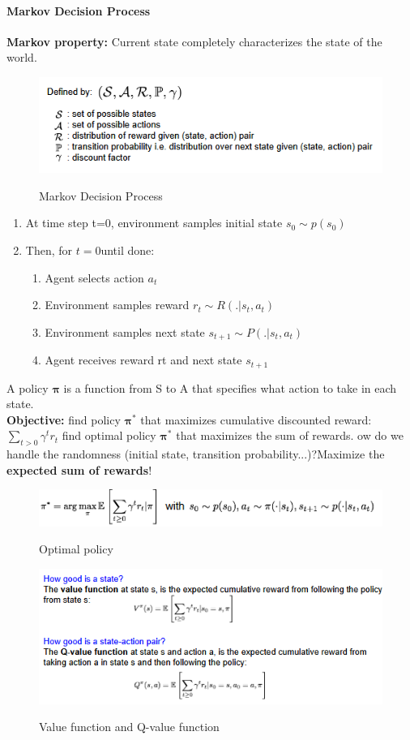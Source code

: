 \documentclass[11pt]{article}
\begin{document}
\paragraph{Markov Decision Process}
\textbf{Markov property:} Current state completely characterizes the state of the world.
\begin{figure}[h]
\centering
\captionsetup{justification=centering}
\includegraphics[width=0.6\linewidth]{L1310.pdf}
\label{fig:L1310}
\caption{ Markov Decision Process}
\end{figure}

\begin{enumerate}
    \item At time step t=0, environment samples initial state $s_0 \sim p(s_0)$
    \item Then, for $t=0 $until done:
     \begin{enumerate}
         \item Agent selects action $a_t$
         \item Environment samples reward $r_t \sim R( . | s_t, a_t)$
         \item Environment samples next state $s_{t+1 } \sim P( . | s_t, a_t)$
         \item Agent receives reward rt and next state $s_{t+1}$
     \end{enumerate}{}
\end{enumerate}{}
A policy $\boldsymbol{\pi}$ is a function from S to A that specifies what action to take in each state.\\
\textbf{Objective:} find policy $\boldsymbol{\pi}^*$  that maximizes cumulative discounted reward: $\sum_{t>0} \gamma^t r_t$
find optimal policy $\boldsymbol{\pi}^*$  that maximizes the sum of rewards.
ow do we handle the randomness (initial state, transition probability...)?Maximize the \textbf{expected sum of rewards}!
\clearpage
\begin{figure}[h]
\centering
\captionsetup{justification=centering}
\includegraphics[width=0.6\linewidth]{L1311.pdf}
\label{fig:L1311}
\caption{ Optimal policy}
\end{figure}
\begin{figure}[h]
\centering
\captionsetup{justification=centering}
\includegraphics[width=0.7\linewidth]{L1312.pdf}
\label{fig:L1312}
\caption{ Value function and Q-value function}
\end{figure}
\end{document}
